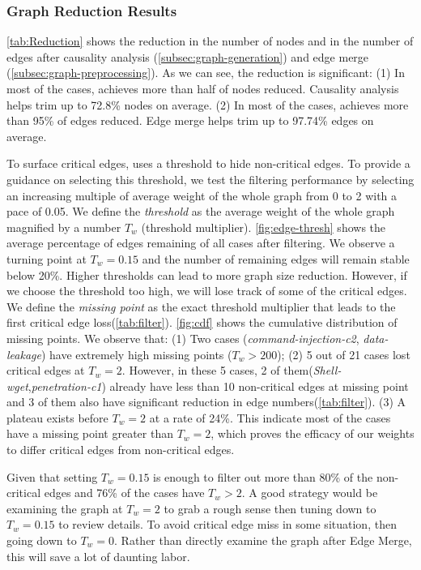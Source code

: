 \subsubsection{Graph Reduction Results}
\label{subsec:graphreduction}



\cref{tab:Reduction} shows the reduction in the number of nodes and in the number of edges after causality analysis (\cref{subsec:graph-generation}) and edge merge (\cref{subsec:graph-preprocessing}).
As we can see, the reduction is significant: (1) In most of the cases, \tool achieves more than half of nodes reduced. Causality analysis helps trim up to 72.8\% nodes on average.
(2) In most of the cases, \tool achieves more than 95\% of edges reduced. Edge merge helps trim up to 97.74\% edges on average.

To surface critical edges, \tool uses a threshold to hide non-critical edges.
To provide a guidance on selecting this threshold, we test the filtering performance by selecting an increasing multiple of average weight of the whole graph from 0 to 2 with a pace of 0.05.
We define the \emph{threshold} as the average weight of the whole graph magnified by a number $T_w$ (\ie threshold multiplier). 
%
\cref{fig:edge-thresh} shows the average percentage of edges remaining of all cases after filtering. We observe a turning point at $T_w = 0.15$ and the number of remaining edges will remain stable below 20\%. Higher thresholds can lead to more graph size reduction. However, if we choose the threshold too high, we will lose track of some of the critical edges. 
%
We define the \emph{missing point} as the exact threshold multiplier that leads to the first critical edge loss(\cref{tab:filter}). 
\cref{fig:cdf} shows the cumulative distribution of missing points.
We observe that: 
(1) Two cases (\emph{command-injection-c2}, \emph{data-leakage}) have extremely high missing points ($T_w > 200$);
(2) 5 out of 21 cases lost critical edges at $T_w = 2$. However, in these 5 cases, 2 of them(\emph{Shell-wget},\emph{penetration-c1}) already have less than 10 non-critical edges at missing point and 3 of them also have significant reduction in edge numbers(\cref{tab:filter}).
(3) A plateau exists before $T_w = 2$ at a rate of 24\%. This indicate most of the cases have a missing point greater than $T_w = 2$, which proves the efficacy of our weights to differ critical edges from non-critical edges.

Given that setting $T_w = 0.15$ is enough to filter out more than 80\% of the non-critical edges and 76\% of the cases have $T_w > 2$. A good strategy would be examining the graph at $T_w = 2$ to grab a rough sense then tuning down to $T_w = 0.15$ to review details. To avoid critical edge miss in some situation, then going down to $T_w = 0$. Rather than directly examine the graph after Edge Merge, this will save a lot of daunting labor.
  


